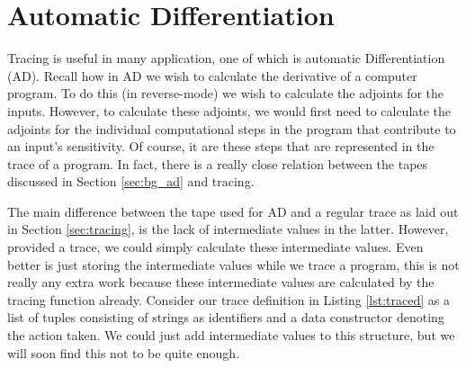 \section{Automatic Differentiation} \label{sec:ad}
    Tracing is useful in many application, one of which is automatic Differentiation (AD).
    Recall how in AD we wish to calculate the derivative of a computer program.
    To do this (in reverse-mode) we wish to calculate the adjoints for the inputs.
    However, to calculate these adjoints, we would first need to calculate the adjoints for the individual computational steps in the program that contribute to an input's sensitivity.
    Of course, it are these steps that are represented in the trace of a program.
    In fact, there is a really close relation between the tapes discussed in Section \ref{sec:bg_ad} and tracing.

    The main difference between the tape used for AD and a regular trace as laid out in Section \ref{sec:tracing}, is the lack of intermediate values in the latter.
    However, provided a trace, we could simply calculate these intermediate values.
    Even better is just storing the intermediate values while we trace a program, this is not really any extra work because these intermediate values are calculated by the tracing function already.
    Consider our trace definition in Listing \ref{lst:traced} as a list of tuples consisting of strings as identifiers and a data constructor denoting the action taken.
    We could just add intermediate values to this structure, but we will soon find this not to be quite enough.
    
